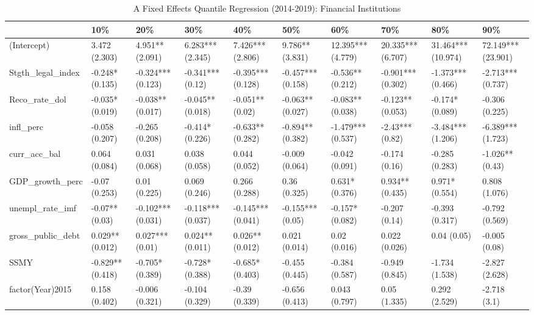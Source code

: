 \begin{table}[ht]
\centering
\caption{A Fixed Effects Quantile Regression (2014-2019): Financial Institutions} 
\begingroup\small
\begin{tabular}{llllllllll}
  \toprule
 & 10\% & 20\% & 30\% & 40\% & 50\% & 60\% & 70\% & 80\% & 90\% \\ 
  \midrule
(Intercept) & 3.472 (2.303) & 4.951** (2.091) & 6.283*** (2.345) & 7.426*** (2.806) & 9.786** (3.831) & 12.395*** (4.779) & 20.335*** (6.707) & 31.464*** (10.974) & 72.149*** (23.901) \\ 
  Stgth\_legal\_index & -0.248* (0.135) & -0.324*** (0.123) & -0.341*** (0.12) & -0.395*** (0.128) & -0.457*** (0.158) & -0.536** (0.212) & -0.901*** (0.302) & -1.373*** (0.466) & -2.713*** (0.737) \\ 
  Reco\_rate\_dol & -0.035* (0.019) & -0.038** (0.017) & -0.045** (0.018) & -0.051** (0.02) & -0.063** (0.027) & -0.083** (0.038) & -0.123** (0.053) & -0.174* (0.089) & -0.306 (0.225) \\ 
  infl\_perc & -0.058 (0.207) & -0.265 (0.208) & -0.414* (0.226) & -0.633** (0.282) & -0.894** (0.382) & -1.479*** (0.537) & -2.43*** (0.82) & -3.484*** (1.206) & -6.389*** (1.723) \\ 
  curr\_acc\_bal & 0.064 (0.084) & 0.031 (0.068) & 0.038 (0.058) & 0.044 (0.052) & -0.009 (0.064) & -0.042 (0.091) & -0.174 (0.16) & -0.285 (0.283) & -1.026** (0.43) \\ 
  GDP\_growth\_perc & -0.07 (0.253) & 0.01 (0.225) & 0.069 (0.246) & 0.266 (0.288) & 0.36 (0.325) & 0.631* (0.376) & 0.934** (0.435) & 0.971* (0.554) & 0.808 (1.076) \\ 
  unempl\_rate\_imf & -0.07** (0.03) & -0.102*** (0.031) & -0.118*** (0.037) & -0.145*** (0.041) & -0.155*** (0.05) & -0.157* (0.082) & -0.207 (0.14) & -0.393 (0.317) & -0.792 (0.569) \\ 
  gross\_public\_debt & 0.029** (0.012) & 0.027*** (0.01) & 0.024** (0.011) & 0.026** (0.012) & 0.021 (0.014) & 0.02 (0.016) & 0.022 (0.026) & 0.04 (0.05) & -0.005 (0.08) \\ 
  SSMY & -0.829** (0.418) & -0.705* (0.389) & -0.728* (0.388) & -0.685* (0.403) & -0.455 (0.445) & -0.384 (0.587) & -0.949 (0.845) & -1.734 (1.538) & -2.827 (2.628) \\ 
  factor(Year)2015 & 0.158 (0.402) & -0.006 (0.321) & -0.104 (0.329) & -0.39 (0.339) & -0.656 (0.413) & 0.043 (0.797) & 0.05 (1.335) & 0.292 (2.529) & -2.718 (3.1) \\ 

\end{tabular}
\end{table}
